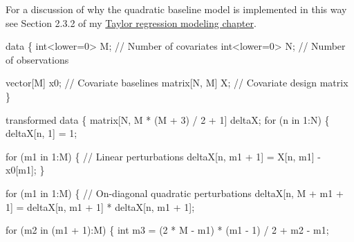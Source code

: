 \documentclass[
  letterpaper,
  DIV=11,
  numbers=noendperiod]{scrartcl}
\newenvironment{Shaded}{\begin{snugshade}}{\end{snugshade}}
\newcommand{\CommentTok}[1]{\textcolor[rgb]{0.37,0.37,0.37}{#1}}
\newcommand{\ControlFlowTok}[1]{\textcolor[rgb]{0.00,0.23,0.31}{#1}}
\newcommand{\DataTypeTok}[1]{\textcolor[rgb]{0.68,0.00,0.00}{#1}}
\newcommand{\DecValTok}[1]{\textcolor[rgb]{0.68,0.00,0.00}{#1}}
\newcommand{\KeywordTok}[1]{\textcolor[rgb]{0.00,0.23,0.31}{#1}}
\newcommand{\NormalTok}[1]{\textcolor[rgb]{0.00,0.23,0.31}{#1}}
\begin{document}
For a discussion of why the quadratic baseline model is implemented in
this way see Section 2.3.2 of my
\href{https://betanalpha.github.io/assets/case_studies/taylor_models.html\#232_Higher-Order_Implementations}{Taylor
regression modeling chapter}.

\begin{codelisting}

\caption{\texttt{multi\textbackslash\_prior\textbackslash\_model.stan}}

\begin{Shaded}
\begin{Highlighting}[]
\KeywordTok{data}\NormalTok{ \{}
  \DataTypeTok{int}\NormalTok{\textless{}}\KeywordTok{lower}\NormalTok{=}\DecValTok{0}\NormalTok{\textgreater{} M;  }\CommentTok{// Number of covariates}
  \DataTypeTok{int}\NormalTok{\textless{}}\KeywordTok{lower}\NormalTok{=}\DecValTok{0}\NormalTok{\textgreater{} N;  }\CommentTok{// Number of observations}
  
  \DataTypeTok{vector}\NormalTok{[M] x0;    }\CommentTok{// Covariate baselines}
  \DataTypeTok{matrix}\NormalTok{[N, M] X;  }\CommentTok{// Covariate design matrix}
\NormalTok{\}}

\KeywordTok{transformed data}\NormalTok{ \{}
  \DataTypeTok{matrix}\NormalTok{[N, M * (M + }\DecValTok{3}\NormalTok{) / }\DecValTok{2}\NormalTok{ + }\DecValTok{1}\NormalTok{] deltaX;}
  \ControlFlowTok{for}\NormalTok{ (n }\ControlFlowTok{in} \DecValTok{1}\NormalTok{:N) \{}
\NormalTok{    deltaX[n, }\DecValTok{1}\NormalTok{] = }\DecValTok{1}\NormalTok{;}
    
    \ControlFlowTok{for}\NormalTok{ (m1 }\ControlFlowTok{in} \DecValTok{1}\NormalTok{:M) \{}
      \CommentTok{// Linear perturbations}
\NormalTok{      deltaX[n, m1 + }\DecValTok{1}\NormalTok{] = X[n, m1] {-} x0[m1];}
\NormalTok{    \}}
    
    \ControlFlowTok{for}\NormalTok{ (m1 }\ControlFlowTok{in} \DecValTok{1}\NormalTok{:M) \{}
      \CommentTok{// On{-}diagonal quadratic perturbations}
\NormalTok{      deltaX[n, M + m1 + }\DecValTok{1}\NormalTok{] }
\NormalTok{        = deltaX[n, m1 + }\DecValTok{1}\NormalTok{] * deltaX[n, m1 + }\DecValTok{1}\NormalTok{];}
  
      \ControlFlowTok{for}\NormalTok{ (m2 }\ControlFlowTok{in}\NormalTok{ (m1 + }\DecValTok{1}\NormalTok{):M) \{}
        \DataTypeTok{int}\NormalTok{ m3 = (}\DecValTok{2}\NormalTok{ * M {-} m1) * (m1 {-} }\DecValTok{1}\NormalTok{) / }\DecValTok{2}\NormalTok{ + m2 {-} m1;}
          

\end{Highlighting}
\end{Shaded}
\end{codelisting}
\end{document}
